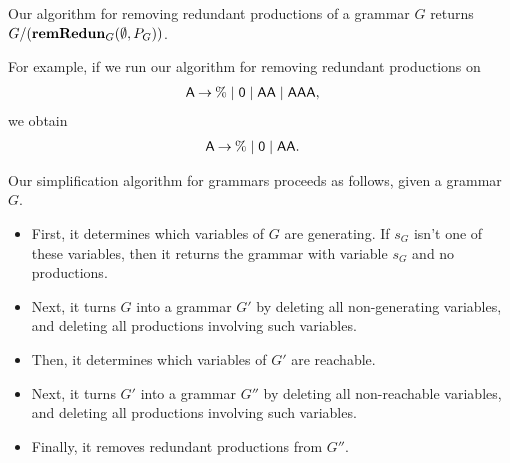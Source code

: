 Our algorithm for removing redundant productions of a grammar $G$
returns $G/(\mathbf{remRedun}_G(\emptyset,P_G))$.

For example, if we run our algorithm for removing redundant productions
on
\begin{align*}
\mathsf{A} &\mathbin{\to} \% \mid \mathsf{0} \mid \mathsf{AA} \mid \mathsf{AAA} ,
\end{align*}
we obtain
\begin{align*}
\mathsf{A} &\mathbin{\to} \% \mid \mathsf{0} \mid \mathsf{AA} .
\end{align*}

Our simplification algorithm for grammars proceeds as follows, given
a grammar $G$.
\begin{itemize}
\item First, it determines which variables of $G$ are generating.
If $s_G$ isn't one of these variables, then it returns the
grammar with variable $s_G$ and no productions.

\item Next, it turns $G$ into a grammar $G'$ by deleting all
non-generating variables, and deleting all productions involving such
variables.

\item Then, it determines which variables of $G'$ are reachable.

\item Next, it turns $G'$ into a grammar $G''$ by deleting all
non-reachable variables, and deleting all productions involving such
variables.

\item Finally, it removes redundant productions from $G''$.
\end{itemize}

